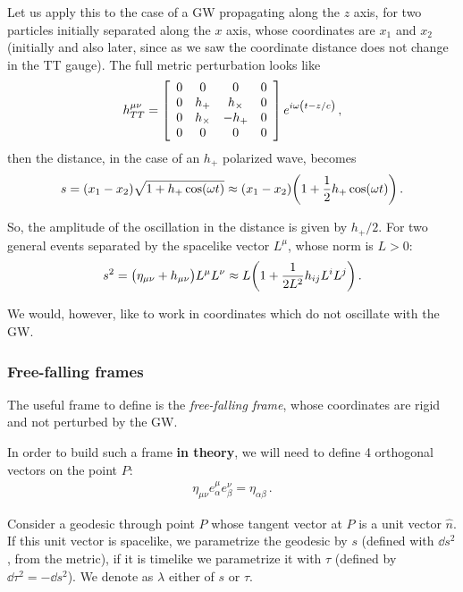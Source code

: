 \documentclass[main.tex]{subfiles}
\begin{document}
Let us apply this to the case of a GW propagating along the \(z\) axis, for two particles initially separated along the \(x\) axis, whose coordinates are \(x_1 \) and \(x_2 \) (initially and also later, since as we saw the coordinate distance does not change in the TT gauge).
The full metric perturbation looks like 
%
\begin{subequations}
\begin{align}
h^{\mu \nu }_{TT} = \left[\begin{array}{cccc}
0 & 0 & 0 & 0 \\ 
0 & h_{+} & h_{ \times} & 0 \\ 
0 & h_{ \times } & - h_{+} & 0 \\ 
0 & 0 & 0 & 0
\end{array}\right] e^{i \omega \qty(t - z/c)}
\,,
\end{align}
\end{subequations}
%
then the distance, in the case of an \(h_{+}\) polarized wave, becomes 
%
\begin{align}
s = (x_1 - x_2 ) \sqrt{1 + h_{+} \cos(\omega t)}
\approx (x_1 -x_2 ) \qty(1 + \frac{1}{2} h_{+} \cos(\omega t))
\,.
\end{align}

So, the amplitude of the oscillation in the distance is given by \(h_{+} / 2\). 
For two general events separated by the spacelike vector \(L^{\mu }\), whose norm is \(L > 0\): 
%
\begin{align}
s^2 = \qty(\eta_{\mu \nu } + h_{\mu \nu } )L^{\mu } L^{\nu }
\approx L \qty(1 + \frac{1}{2 L^2} h_{ij} L^{i} L^{j})
\,.
\end{align}

We would, however, like to work in coordinates which do not oscillate with the GW.

\subsubsection{Free-falling frames}

The useful frame to define is the \emph{free-falling frame}, whose coordinates are rigid and not perturbed by the GW. 

In order to build such a frame \textbf{in theory}, we will need to define 4 orthogonal vectors on the point \(P\): 
%
\begin{align}
\eta_{\mu \nu } e^{\mu }_{\alpha } e^{\nu }_{\beta } = \eta_{\alpha \beta }
\,.
\end{align}

Consider a geodesic through point \(P\) whose tangent vector at \(P\) is a unit vector \(\hat{n}\).
If this unit vector is spacelike, we parametrize the geodesic by \(s\) (defined with \(\dd{s^2}\), from the metric), if it is timelike we parametrize it with \(\tau\) (defined by \(\dd{\tau^2 } = - \dd{s^2}\)).
We denote as \(\lambda \) either of \(s\) or \(\tau \). 
\end{document}
